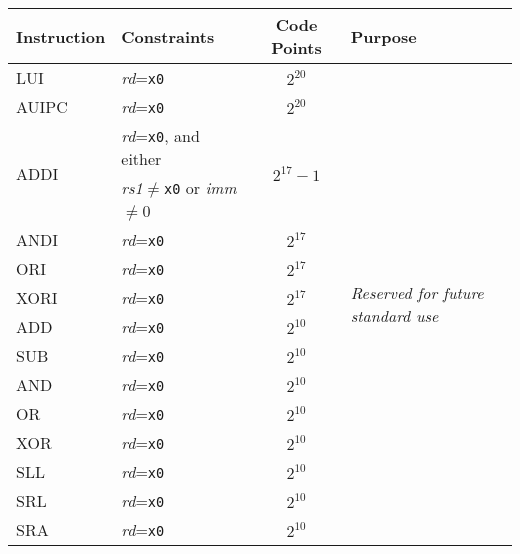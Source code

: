 \begin{table}[hbt]
\centering
\begin{tabular}{|l|l|c|l|}
  \hline
  Instruction           & Constraints                                 & Code Points & Purpose \\ \hline \hline
  LUI                   & {\em rd}={\tt x0}                           & $2^{20}$                    & \multirow{15}{*}{\em Reserved for future standard use} \\ \cline{1-3}
  AUIPC                 & {\em rd}={\tt x0}                           & $2^{20}$                    & \\ \cline{1-3}
  \multirow{2}{*}{ADDI} & {\em rd}={\tt x0}, and either               & \multirow{2}{*}{$2^{17}-1$} & \\
                        & {\em rs1}$\neq${\tt x0} or {\em imm}$\neq$0 &                             & \\ \cline{1-3}
  ANDI                  & {\em rd}={\tt x0}                           & $2^{17}$                    & \\ \cline{1-3}
  ORI                   & {\em rd}={\tt x0}                           & $2^{17}$                    & \\ \cline{1-3}
  XORI                  & {\em rd}={\tt x0}                           & $2^{17}$                    & \\ \cline{1-3}
  ADD                   & {\em rd}={\tt x0}                           & $2^{10}$                    & \\ \cline{1-3}
  SUB                   & {\em rd}={\tt x0}                           & $2^{10}$                    & \\ \cline{1-3}
  AND                   & {\em rd}={\tt x0}                           & $2^{10}$                    & \\ \cline{1-3}
  OR                    & {\em rd}={\tt x0}                           & $2^{10}$                    & \\ \cline{1-3}
  XOR                   & {\em rd}={\tt x0}                           & $2^{10}$                    & \\ \cline{1-3}
  SLL                   & {\em rd}={\tt x0}                           & $2^{10}$                    & \\ \cline{1-3}
  SRL                   & {\em rd}={\tt x0}                           & $2^{10}$                    & \\ \cline{1-3}
  SRA                   & {\em rd}={\tt x0}                           & $2^{10}$                    & \\ \hline \hline

\end{tabular}
\end{table}
